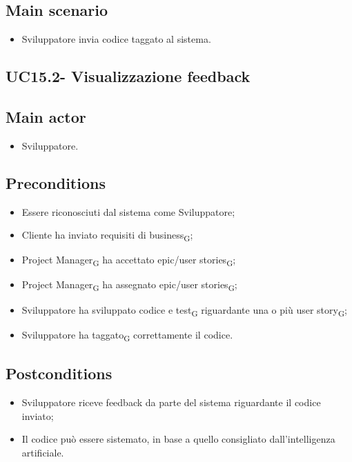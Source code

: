 \documentclass{article}
\begin{document}
    \subsection*{Main scenario}
        \begin{itemize}
            \item Sviluppatore invia codice taggato al sistema.
        \end{itemize}
        
    \subsection{UC15.2- Visualizzazione feedback}
    \subsection*{Main actor}
        \begin{itemize}
            \item Sviluppatore.
        \end{itemize}
        
    \subsection*{Preconditions}
        \begin{itemize}
            \item Essere riconosciuti dal sistema come Sviluppatore;
            \item Cliente ha inviato requisiti di business\textsubscript{G};
            \item Project Manager\textsubscript{G} ha accettato epic/user stories\textsubscript{G};
            \item Project Manager\textsubscript{G} ha assegnato epic/user stories\textsubscript{G};
            \item Sviluppatore ha sviluppato codice e test\textsubscript{G} riguardante una o più user story\textsubscript{G};
            \item Sviluppatore ha taggato\textsubscript{G} correttamente il codice.
        \end{itemize}
        
    \subsection*{Postconditions}
        \begin{itemize}
            \item Sviluppatore riceve feedback da parte del sistema riguardante il codice inviato;
            \item Il codice può essere sistemato, in base a quello consigliato dall'intelligenza artificiale.
        \end{itemize}
\end{document}
